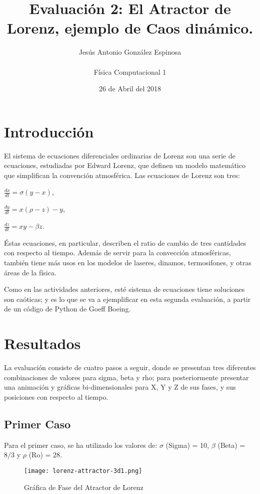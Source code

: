 \documentclass[a4paper]{article}
\title{Evaluación 2: El Atractor de Lorenz, ejemplo de Caos dinámico. }
\author{Jesús Antonio González Espinosa \\ \\ Física Computacional 1}
\date{26 de Abril del 2018}
\begin{document}
\maketitle

\section{Introducción}
El sistema de ecuaciones diferenciales ordinarias de Lorenz son una serie de ecuaciones, estudiadas por Edward Lorenz, que definen un modelo matemático que simplifican la convención atmosférica. Las ecuaciones de Lorenz son tres:

\begin{center}
$\frac{dx}{dt} = \sigma(y-x)$,

$\frac{dy}{dt} = x(\rho - z) - y$,

$\frac{dz}{dt} = xy - \beta z$.
\end{center}

Éstas ecuaciones, en particular, describen el ratio de cambio de tres cantidades con respecto al tiempo. Además de servir para la convección atmosféricas, también tiene más usos en los modelos de laseres, dinamos, termosifones, y otras áreas de la física.

Como en las actividades anteriores, esté sistema de ecuaciones tiene soluciones son caóticas; y es lo que se va a ejemplificar en esta segunda evaluación, a partir de un código de Python de Goeff Boeing.

\pagebreak


\section{Resultados}
La evaluación consiste de cuatro pasos a seguir, donde se presentan tres diferentes combinaciones de valores para sigma, beta y rho; para posteriormente presentar una animación y gráficas bi-dimensionales para X, Y y Z de sus fases, y sus posiciones con respecto al tiempo. 

\subsection{Primer Caso}
Para el primer caso, se ha utilizado los valores de:
$\sigma$ (Sigma) = 10, $\beta$ (Beta) = 8/3 y $\rho$ (Ro) = 28. 

\begin{figure}[h!]
  \centering
  \texttt{[image: lorenz-attractor-3d1.png]}
   \caption{Gráfica de Fase del Atractor de Lorenz}
\end{figure}
\end{document}
